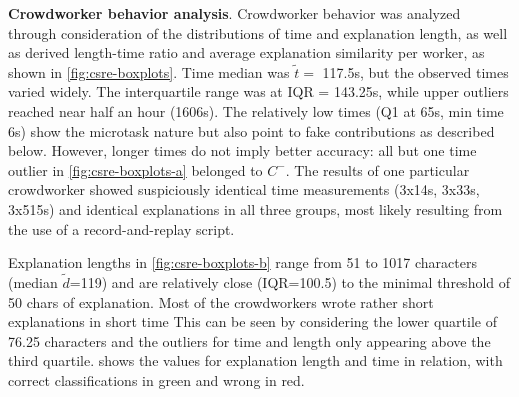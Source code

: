 \textbf{Crowdworker behavior analysis}. Crowdworker behavior was analyzed through consideration of the distributions of time and explanation length, as well as derived length-time ratio and average explanation similarity per worker, as shown in \cref{fig:csre-boxplots}.
Time median was \(\tilde t=\) 117.5s, but the observed times varied widely.
The interquartile range was at IQR = 143.25s, while upper outliers reached near half an hour (1606s).
The relatively low times (Q1 at 65s, min time 6s) show the microtask nature but also point to fake contributions as described below.
However, longer times do not imply better accuracy: all but one time outlier in \cref{fig:csre-boxplots-a} belonged to \(C^-\).
The results of one particular crowdworker showed suspiciously identical time measurements (3x14s, 3x33s, 3x515s) and identical explanations in all three groups, most likely resulting from the use of a record-and-replay script.

Explanation lengths in \cref{fig:csre-boxplots-b} range from 51 to 1017 characters (median
\(\tilde{d}\)=119) and are relatively close (IQR=100.5) to the minimal threshold of 50 chars of explanation.
Most of the crowdworkers wrote rather short explanations in short time
This can be seen by considering the lower quartile of 76.25 characters and the outliers for time and length only appearing above the third quartile.
 shows the values for explanation length and time in relation, with correct classifications in green and wrong in red.

